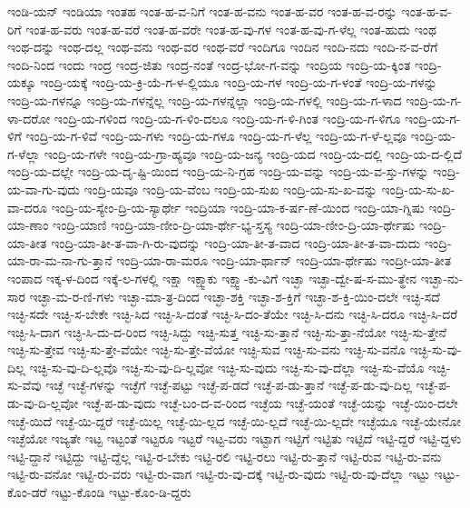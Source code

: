 {ಇಂಡಿ-ಯನ್
ಇಂಡಿಯಾ
ಇಂತಹ
ಇಂತ-ಹ-ವ-ನಿಗೆ
ಇಂತ-ಹ-ವನು
ಇಂತ-ಹ-ವರ
ಇಂತ-ಹ-ವ-ರನ್ನು
ಇಂತ-ಹ-ವ-ರಿಗೆ
ಇಂತ-ಹ-ವರು
ಇಂತ-ಹ-ವರೆ
ಇಂತ-ಹ-ವರೇ
ಇಂತ-ಹ-ವು-ಗಳ
ಇಂತ-ಹ-ವು-ಗ-ಳೆಲ್ಲ
ಇಂತ-ಹುದು
ಇಂಥ
ಇಂಥ-ದನ್ನು
ಇಂಥ-ದಲ್ಲ
ಇಂಥ-ವನು
ಇಂಥ-ವರ
ಇಂಥ-ವರೆ
ಇಂದಿಗೂ
ಇಂದಿನ
ಇಂದಿ-ನದು
ಇಂದಿ-ನ-ವ-ರೆಗೆ
ಇಂದಿ-ನಿಂದ
ಇಂದು
ಇಂದ್ರ
ಇಂದ್ರ-ಜಿತು
ಇಂದ್ರ-ನಂತೆ
ಇಂದ್ರ-ಭೋ-ಗ-ವನ್ನು
ಇಂದ್ರಿಯ
ಇಂದ್ರಿ-ಯ-ಕ್ಕಿಂತ
ಇಂದ್ರಿ-ಯಕ್ಕೂ
ಇಂದ್ರಿ-ಯಕ್ಕೆ
ಇಂದ್ರಿ-ಯ-ಕ್ರಿ-ಯೆ-ಗ-ಳ-ಲ್ಲಿಯೂ
ಇಂದ್ರಿ-ಯ-ಗಳ
ಇಂದ್ರಿ-ಯ-ಗ-ಳಂತೆ
ಇಂದ್ರಿ-ಯ-ಗಳನ್ನು
ಇಂದ್ರಿ-ಯ-ಗಳನ್ನೂ
ಇಂದ್ರಿ-ಯ-ಗಳನ್ನೆಲ್ಲ
ಇಂದ್ರಿ-ಯ-ಗಳನ್ನೆಲ್ಲಾ
ಇಂದ್ರಿ-ಯ-ಗಳಲ್ಲಿ
ಇಂದ್ರಿ-ಯ-ಗ-ಳಾದ
ಇಂದ್ರಿ-ಯ-ಗ-ಳಾ-ದರೋ
ಇಂದ್ರಿ-ಯ-ಗಳಿಂದ
ಇಂದ್ರಿ-ಯ-ಗ-ಳಿಂ-ದಲೂ
ಇಂದ್ರಿ-ಯ-ಗ-ಳಿ-ಗಿಂತ
ಇಂದ್ರಿ-ಯ-ಗ-ಳಿಗೂ
ಇಂದ್ರಿ-ಯ-ಗ-ಳಿಗೆ
ಇಂದ್ರಿ-ಯ-ಗ-ಳಿವೆ
ಇಂದ್ರಿ-ಯ-ಗಳು
ಇಂದ್ರಿ-ಯ-ಗಳೂ
ಇಂದ್ರಿ-ಯ-ಗ-ಳೆಲ್ಲ
ಇಂದ್ರಿ-ಯ-ಗ-ಳೆ-ಲ್ಲವೂ
ಇಂದ್ರಿ-ಯ-ಗ-ಳೆಲ್ಲಾ
ಇಂದ್ರಿ-ಯ-ಗಳೇ
ಇಂದ್ರಿ-ಯ-ಗ್ರಾ-ಹ್ಯವೂ
ಇಂದ್ರಿ-ಯ-ಜನ್ಯ
ಇಂದ್ರಿ-ಯದ
ಇಂದ್ರಿ-ಯ-ದಲ್ಲಿ
ಇಂದ್ರಿ-ಯ-ದ-ಲ್ಲಿದೆ
ಇಂದ್ರಿ-ಯ-ದಲ್ಲೇ
ಇಂದ್ರಿ-ಯ-ದೃ-ಷ್ಟಿ-ಯಿಂದ
ಇಂದ್ರಿ-ಯ-ನಿ-ಗ್ರಹ
ಇಂದ್ರಿ-ಯ-ವನ್ನು
ಇಂದ್ರಿ-ಯ-ವ-ಸ್ತು-ಗಳನ್ನು
ಇಂದ್ರಿ-ಯ-ವಾ-ಗು-ವುದು
ಇಂದ್ರಿ-ಯವೂ
ಇಂದ್ರಿ-ಯ-ವೆಂಬ
ಇಂದ್ರಿ-ಯ-ಸುಖ
ಇಂದ್ರಿ-ಯ-ಸು-ಖ-ವನ್ನು
ಇಂದ್ರಿ-ಯ-ಸು-ಖ-ವಾ-ದರೂ
ಇಂದ್ರಿ-ಯ-ಸ್ಯೇಂ-ದ್ರಿ-ಯ-ಸ್ಯಾರ್ಥೇ
ಇಂದ್ರಿಯಾ
ಇಂದ್ರಿ-ಯಾ-ಕ-ರ್ಷ-ಣೆ-ಯಿಂದ
ಇಂದ್ರಿ-ಯಾ-ಗ್ನಿಷು
ಇಂದ್ರಿ-ಯಾ-ಣಾಂ
ಇಂದ್ರಿ-ಯಾಣಿ
ಇಂದ್ರಿ-ಯಾ-ಣೀಂ-ದ್ರಿ-ಯಾ-ರ್ಥೇ-ಭ್ಯ-ಸ್ತಸ್ಯ
ಇಂದ್ರಿ-ಯಾ-ಣೀಂ-ದ್ರಿ-ಯಾ-ರ್ಥೇಷು
ಇಂದ್ರಿ-ಯಾ-ತೀತ
ಇಂದ್ರಿ-ಯಾ-ತೀ-ತ-ವಾ-ಗಿ-ರು-ವುದನ್ನು
ಇಂದ್ರಿ-ಯಾ-ತೀ-ತ-ವಾದ
ಇಂದ್ರಿ-ಯಾ-ತೀ-ತ-ವಾ-ದುದು
ಇಂದ್ರಿ-ಯಾ-ರಾ-ಮ-ನಾ-ಗು-ತ್ತಾನೆ
ಇಂದ್ರಿ-ಯಾ-ರಾ-ಮರೂ
ಇಂದ್ರಿ-ಯಾ-ರ್ಥಾನ್
ಇಂದ್ರಿ-ಯಾ-ರ್ಥೇಷು
ಇಂದ್ರೀ-ಯಾ-ತೀತ
ಇಂಪಾದ
ಇಕ್ಕ-ಳ-ದಿಂದ
ಇಕ್ಕೆ-ಲ-ಗಳಲ್ಲಿ
ಇಕ್ಷಾ
ಇಕ್ಷ್ವಾಕು
ಇಕ್ಷ್ವಾ-ಕು-ವಿಗೆ
ಇಚ್ಛಾ
ಇಚ್ಛಾ-ದ್ವೇ-ಷ-ಸ-ಮು-ತ್ಥೇನ
ಇಚ್ಛಾ-ನು-ಸಾರ
ಇಚ್ಛಾ-ಮ-ರ-ಣಿ-ಗಳು
ಇಚ್ಛಾ-ಮಾ-ತ್ರ-ದಿಂದ
ಇಚ್ಛಾ-ಶಕ್ತಿ
ಇಚ್ಛಾ-ಶ-ಕ್ತಿಗೆ
ಇಚ್ಛಾ-ಶ-ಕ್ತಿ-ಯಿಂ-ದಲೇ
ಇಚ್ಛಿ-ಸದೆ
ಇಚ್ಛಿ-ಸದೇ
ಇಚ್ಛಿ-ಸ-ಬೇಕೇ
ಇಚ್ಛಿ-ಸಿದ
ಇಚ್ಛಿ-ಸಿ-ದಂತೆ
ಇಚ್ಛಿ-ಸಿ-ದಂ-ತೆಯೇ
ಇಚ್ಛಿ-ಸಿ-ದನು
ಇಚ್ಛಿ-ಸಿ-ದರೂ
ಇಚ್ಛಿ-ಸಿ-ದರೆ
ಇಚ್ಛಿ-ಸಿ-ದಾಗ
ಇಚ್ಛಿ-ಸಿ-ದು-ದ-ರಿಂದ
ಇಚ್ಛಿ-ಸಿದ್ದು
ಇಚ್ಛಿ-ಸುತ್ತ
ಇಚ್ಛಿ-ಸು-ತ್ತಾನೆ
ಇಚ್ಛಿ-ಸು-ತ್ತಾ-ನೆಯೋ
ಇಚ್ಛಿ-ಸು-ತ್ತೇನೆ
ಇಚ್ಛಿ-ಸು-ತ್ತೇವ
ಇಚ್ಛಿ-ಸು-ತ್ತೇ-ವೆಯೇ
ಇಚ್ಛಿ-ಸು-ತ್ತೇ-ವೆಯೋ
ಇಚ್ಛಿ-ಸುವ
ಇಚ್ಛಿ-ಸು-ವನು
ಇಚ್ಛಿ-ಸು-ವನೊ
ಇಚ್ಛಿ-ಸು-ವು-ದಿಲ್ಲ
ಇಚ್ಛಿ-ಸು-ವು-ದಿ-ಲ್ಲವೊ
ಇಚ್ಛಿ-ಸು-ವು-ದಿ-ಲ್ಲವೋ
ಇಚ್ಛಿ-ಸು-ವುದು
ಇಚ್ಛಿ-ಸು-ವು-ದೆಲ್ಲಾ
ಇಚ್ಛಿ-ಸು-ವೆಯೊ
ಇಚ್ಛಿ-ಸು-ವೆವು
ಇಚ್ಛೆ
ಇಚ್ಛೆ-ಗಳನ್ನು
ಇಚ್ಛೆಗೆ
ಇಚ್ಛೆ-ಪಟ್ಟು
ಇಚ್ಛೆ-ಪ-ಡದೆ
ಇಚ್ಛೆ-ಪ-ಡು-ತ್ತಾನೆ
ಇಚ್ಛೆ-ಪ-ಡು-ವು-ದಿಲ್ಲ
ಇಚ್ಛೆ-ಪ-ಡು-ವು-ದಿ-ಲ್ಲವೋ
ಇಚ್ಛೆ-ಪ-ಡು-ವುದು
ಇಚ್ಛೆ-ಬಂ-ದ-ವ-ರಿಂದ
ಇಚ್ಛೆಯ
ಇಚ್ಛೆ-ಯಂತೆ
ಇಚ್ಛೆ-ಯನ್ನು
ಇಚ್ಛೆ-ಯಿಂ-ದಲೇ
ಇಚ್ಛೆ-ಯಿದೆ
ಇಚ್ಛೆ-ಯಿ-ದ್ದರೆ
ಇಚ್ಛೆ-ಯಿಲ್ಲ
ಇಚ್ಛೆ-ಯಿ-ಲ್ಲದ
ಇಚ್ಛೆ-ಯಿ-ಲ್ಲದೆ
ಇಚ್ಛೆ-ಯಿ-ಲ್ಲದೇ
ಇಚ್ಛೆಯೂ
ಇಚ್ಛೆ-ಯೇನೋ
ಇಚ್ಛೆಯೋ
ಇಜ್ಯತೇ
ಇಟ್ಟ
ಇಟ್ಟಂತೆ
ಇಟ್ಟರೂ
ಇಟ್ಟರೆ
ಇಟ್ಟ-ವರು
ಇಟ್ಟಾಗ
ಇಟ್ಟಿಗೆ
ಇಟ್ಟಿತು
ಇಟ್ಟಿದೆ
ಇಟ್ಟಿ-ದ್ದರೆ
ಇಟ್ಟಿ-ದ್ದಳು
ಇಟ್ಟಿ-ದ್ದಾನೆ
ಇಟ್ಟಿದ್ದು
ಇಟ್ಟಿ-ದ್ದೆಲ್ಲ
ಇಟ್ಟಿ-ರ-ಬೇಕು
ಇಟ್ಟಿ-ರಲಿ
ಇಟ್ಟಿ-ರಲು
ಇಟ್ಟಿ-ರು-ತ್ತಾನೆ
ಇಟ್ಟಿ-ರುವ
ಇಟ್ಟಿ-ರು-ವನು
ಇಟ್ಟಿ-ರು-ವನೋ
ಇಟ್ಟಿ-ರು-ವರು
ಇಟ್ಟಿ-ರು-ವಾಗ
ಇಟ್ಟಿ-ರು-ವು-ದಕ್ಕೆ
ಇಟ್ಟಿ-ರು-ವುದು
ಇಟ್ಟಿ-ರು-ವು-ದೆಲ್ಲಾ
ಇಟ್ಟು
ಇಟ್ಟು-ಕೊಂ-ಡರೆ
ಇಟ್ಟು-ಕೊಂಡಿ
ಇಟ್ಟು-ಕೊಂ-ಡಿ-ದ್ದರು
}
